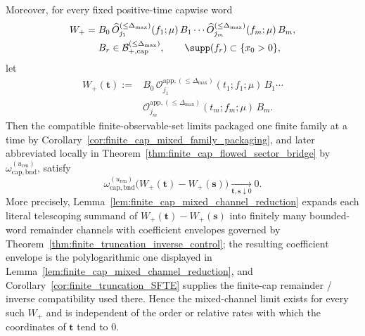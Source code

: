 \begin{corollary}
Moreover, for every fixed positive-time capwise word
\[
\begin{aligned}
W_+
={}&
B_0\,\widehat O_{j_1}^{(\le \Delta_{\max})}(f_1;\mu)\,B_1\cdots
\widehat O_{j_m}^{(\le \Delta_{\max})}(f_m;\mu)\,B_m,\\
& B_r\in\mathcal B^{(\le \Delta_{\max})}_{+,\mathrm{cap}},
\qquad
\supp(f_r)\subset\{x_0>0\},
\end{aligned}
\]
let
\[
\begin{aligned}
W_+(\mathbf t)
:={}&
B_0\,\mathcal O_{j_1}^{\mathrm{app},(\le \Delta_{\max})}(t_1;f_1;\mu)\,B_1\cdots\\
&\mathcal O_{j_m}^{\mathrm{app},(\le \Delta_{\max})}(t_m;f_m;\mu)\,B_m.
\end{aligned}
\]
Then the compatible finite-observable-set limits packaged one finite family at a time by Corollary~\ref{cor:finite_cap_mixed_family_packaging}, and later abbreviated locally in Theorem~\ref{thm:finite_cap_flowed_sector_bridge} by
$\omega_{\mathrm{cap,bnd}}^{(u_{\mathrm{ren}})}$, satisfy
\[
\omega_{\mathrm{cap,bnd}}^{(u_{\mathrm{ren}})}\big(W_+(\mathbf t)-W_+(\mathbf s)\big)
\xrightarrow[\mathbf t,\mathbf s\downarrow 0]{}0.
\]
More precisely, Lemma~\ref{lem:finite_cap_mixed_channel_reduction} expands each literal telescoping summand of
$W_+(\mathbf t)-W_+(\mathbf s)$ into finitely many bounded-word remainder channels with coefficient envelopes governed by
Theorem~\ref{thm:finite_truncation_inverse_control}; the resulting coefficient envelope is the polylogarithmic one displayed in Lemma~\ref{lem:finite_cap_mixed_channel_reduction}, and Corollary~\ref{cor:finite_truncation_SFTE} supplies the finite-cap remainder / inverse compatibility used there.
Hence the mixed-channel limit exists for every such $W_+$ and is independent of the order or relative rates with which the coordinates of $\mathbf t$ tend to $0$.
\end{corollary}

